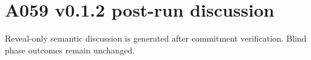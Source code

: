 \section*{A059 v0.1.2 post-run discussion}
Reveal-only semantic discussion is generated after commitment verification. Blind phase outcomes remain unchanged.
